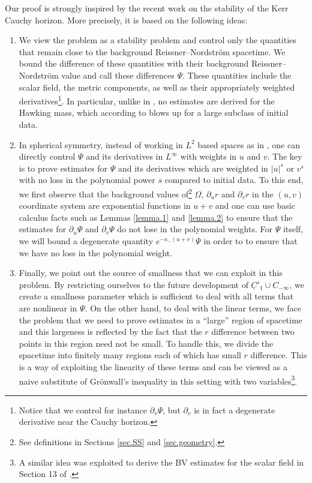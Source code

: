 \documentclass[10pt, reqno]{amsart}
\theoremstyle{definition}
\theoremstyle{remark}
\numberwithin{equation}{section}
\newcommand{\rd}{\partial}
\newcommand{\0}{\emptyset}
\newcommand{\Omg}{\Omega}
\begin{document}
Our proof is strongly inspired by the recent work \cite{DL} on the stability of the Kerr Cauchy horizon. More precisely, it is based on the following ideas:
\begin{enumerate}
\item We view the problem as a stability problem and control only the quantities that remain close to the background Reissner--Nordstr\"om spacetime. We bound the difference of these quantities with their background Reissner--Nordstr\"om value and call these differences $\Psi$. These quantities include the scalar field, the metric components, as well as their appropriately weighted derivatives\footnote{Notice that we control for instance $\rd_v\Psi$, but $\rd_v$ is in fact a degenerate derivative near the Cauchy horizon.}. In particular, unlike in \cite{D2}, no estimates are derived for the Hawking mass, which according to \cite{D2} blows up for a large subclass of initial data.
\item In spherical symmetry, instead of working in $L^2$ based spaces as in \cite{DL}, one can directly control $\Psi$ and its derivatives in $L^\infty$ with weights in $u$ and $v$. The key is to prove estimates for $\Psi$ and its derivatives which are weighted in $|u|^s$ or $v^s$ with no loss in the polynomial power $s$ compared to initial data. To this end, we first observe that the background values of\footnote{See definitions in Sections \ref{sec.SS} and \ref{sec.geometry}.} $\Omg$, $\rd_u r$ and $\rd_v r$ in the $(u,v)$ coordinate system are exponential functions in $u+v$ and one can use basic calculus facts such as Lemmas \ref{lemma.1} and \ref{lemma.2} to ensure that the estimates for $\rd_u\Psi$ and $\rd_v\Psi$ do not lose in the polynomial weights. For $\Psi$ itself, we will bound a degenerate quantity $e^{-\kappa_- (u+v)}\Psi$ in order to to ensure that we have no loss in the polynomial weight.
\item Finally, we point out the source of smallness that we can exploit in this problem. By restricting ourselves to the future development of $\underline{C}'_1\cup C_{-\infty}$, we create a smallness parameter which is sufficient to deal with all terms that are nonlinear in $\Psi$. On the other hand, to deal with the linear terms, we face the problem that we need to prove estimates in a ``large'' region of spacetime and this largeness is reflected by the fact that the $r$ difference between two points in this region need not be small. To handle this, we divide the spacetime into finitely many regions each of which has small $r$ difference. This is a way of exploiting the linearity of these terms and can be viewed as a naive substitute of Gr\"onwall's inequality in this setting with two variables\footnote{A similar idea was exploited to derive the BV estimates for the scalar field in Section 13 of \cite{D2}.}.
\end{enumerate}
\end{document}

